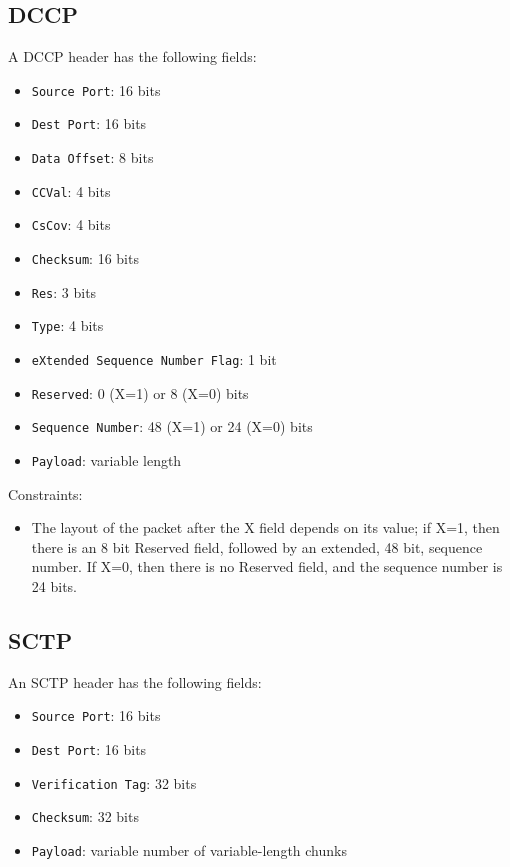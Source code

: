 \documentclass[10pt,a4paper]{article}
\begin{document}
\subsection{DCCP}

A DCCP header has the following fields:
\begin{itemize}
\item \texttt{Source Port}: 16 bits
\item \texttt{Dest Port}: 16 bits
\item \texttt{Data Offset}: 8 bits
\item \texttt{CCVal}: 4 bits
\item \texttt{CsCov}: 4 bits
\item \texttt{Checksum}: 16 bits
\item \texttt{Res}: 3 bits
\item \texttt{Type}: 4 bits
\item \texttt{eXtended Sequence Number Flag}: 1 bit
\item \texttt{Reserved}: 0 (X=1) or 8 (X=0) bits
\item \texttt{Sequence Number}: 48 (X=1) or 24 (X=0) bits
\item \texttt{Payload}: variable length
\end{itemize}

Constraints:
\begin{itemize}
\item The layout of the packet after the X field depends on its value; if X=1, then there
is an 8 bit Reserved field, followed by an extended, 48 bit, sequence number. If X=0, then
there is no Reserved field, and the sequence number is 24 bits.
\end{itemize}

\subsection{SCTP}

An SCTP header has the following fields:
\begin{itemize}
\item \texttt{Source Port}: 16 bits
\item \texttt{Dest Port}: 16 bits
\item \texttt{Verification Tag}: 32 bits
\item \texttt{Checksum}: 32 bits
\item \texttt{Payload}: variable number of variable-length chunks
\end{itemize}
\end{document}
